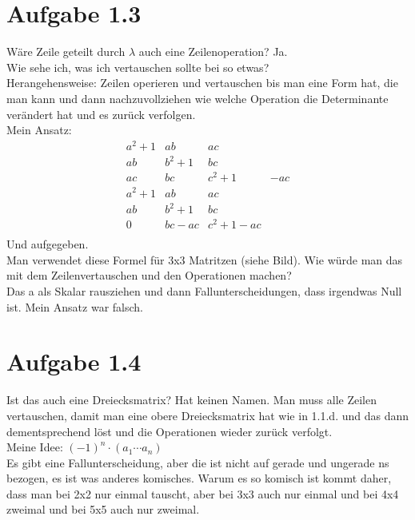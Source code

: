 \documentclass{article} %
\begin{document}
\section{Aufgabe 1.3}
Wäre Zeile geteilt durch $\lambda$ auch eine Zeilenoperation? Ja. \\
Wie sehe ich, was ich vertauschen sollte bei so etwas? \\
Herangehensweise: 
Zeilen operieren und vertauschen bis man eine Form hat, die man kann und dann nachzuvollziehen wie welche Operation die Determinante verändert hat und es zurück verfolgen. \\ \newline
Mein Ansatz: 
\[
\begin{array}{ccc|c}
    a^2+1 & ab & ac \\
    ab & b^2 +1 & bc \\
    ac & bc & c^2 + 1 & - ac \\ \hline
    a^2+1 & ab & ac \\
    ab & b^2 +1 & bc \\
    0 & bc - ac & c^2 + 1 - ac \\
\end{array}
\]
Und aufgegeben. \\ \newline
Man verwendet diese Formel für 3x3 Matritzen (siehe Bild). 
Wie würde man das mit dem Zeilenvertauschen und den Operationen machen?  \\
Das a als Skalar rausziehen und dann Fallunterscheidungen, dass irgendwas Null ist.  Mein Ansatz war falsch. 


\section{Aufgabe 1.4}
Ist das auch eine Dreiecksmatrix? Hat keinen Namen. Man muss alle Zeilen vertauschen, damit man eine obere Dreiecksmatrix hat wie in 1.1.d. und das dann dementsprechend löst und die Operationen wieder zurück verfolgt.  \\ \newline
Meine Idee: $(-1)^n \cdot (a_1\cdots a_n)$  \\ \newline
Es gibt eine Fallunterscheidung, aber die ist nicht auf gerade und ungerade ns bezogen, es ist was anderes komisches. Warum es so komisch ist kommt daher, dass man bei 2x2 nur einmal tauscht, aber bei 3x3 auch nur einmal und bei 4x4 zweimal und bei 5x5 auch nur zweimal. 
\end{document}
